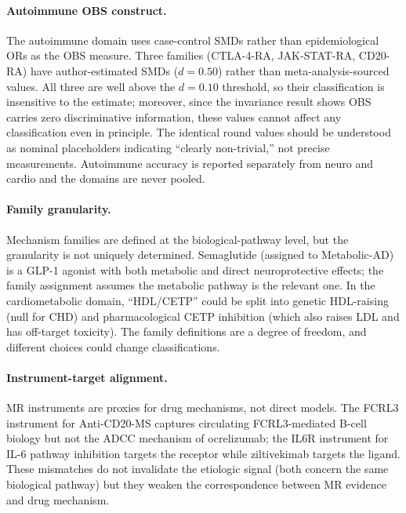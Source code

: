 \documentclass[11pt]{article}
\begin{document}
\paragraph{Autoimmune OBS construct.} The autoimmune domain uses case-control SMDs rather than epidemiological ORs as the OBS measure. Three families (CTLA-4-RA, JAK-STAT-RA, CD20-RA) have author-estimated SMDs ($d = 0.50$) rather than meta-analysis-sourced values. All three are well above the $d = 0.10$ threshold, so their classification is insensitive to the estimate; moreover, since the invariance result shows OBS carries zero discriminative information, these values cannot affect any classification even in principle. The identical round values should be understood as nominal placeholders indicating ``clearly non-trivial,'' not precise measurements. Autoimmune accuracy is reported separately from neuro and cardio and the domains are never pooled.

\paragraph{Family granularity.} Mechanism families are defined at the biological-pathway level, but the granularity is not uniquely determined. Semaglutide (assigned to Metabolic-AD) is a GLP-1 agonist with both metabolic and direct neuroprotective effects; the family assignment assumes the metabolic pathway is the relevant one. In the cardiometabolic domain, ``HDL/CETP'' could be split into genetic HDL-raising (null for CHD) and pharmacological CETP inhibition (which also raises LDL and has off-target toxicity). The family definitions are a degree of freedom, and different choices could change classifications.

\paragraph{Instrument-target alignment.} MR instruments are proxies for drug mechanisms, not direct models. The FCRL3 instrument for Anti-CD20-MS captures circulating FCRL3-mediated B-cell biology but not the ADCC mechanism of ocrelizumab; the IL6R instrument for IL-6 pathway inhibition targets the receptor while ziltivekimab targets the ligand. These mismatches do not invalidate the etiologic signal (both concern the same biological pathway) but they weaken the correspondence between MR evidence and drug mechanism.
\end{document}
